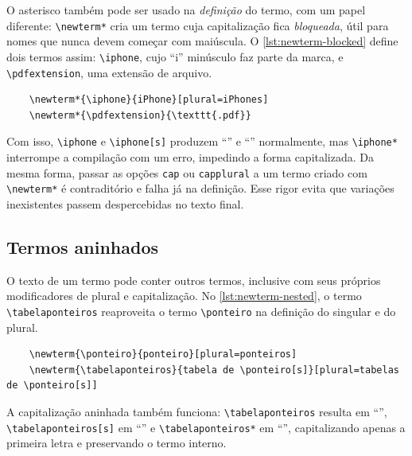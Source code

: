 O asterisco também pode ser usado na \emph{definição} do termo, com um papel diferente: \texttt{\textbackslash{}newterm*} cria um termo cuja capitalização fica \emph{bloqueada}, útil para nomes que nunca devem começar com maiúscula. O \autoref{lst:newterm-blocked} define dois termos assim: \texttt{\textbackslash{}iphone}, cujo \enquote{i} minúsculo faz parte da marca, e \texttt{\textbackslash{}pdfextension}, uma extensão de arquivo.

\begin{listing}[htb]
  \begin{verbatim}
    \newterm*{\iphone}{iPhone}[plural=iPhones]
    \newterm*{\pdfextension}{\texttt{.pdf}}
  \end{verbatim}
  \caption{Definição de termos com capitalização bloqueada}
  \label{lst:newterm-blocked}
\end{listing}

Com isso, \texttt{\textbackslash{}iphone} e \texttt{\textbackslash{}iphone[s]} produzem \enquote{\iphone} e \enquote{\iphone[s]} normalmente, mas \texttt{\textbackslash{}iphone*} interrompe a compilação com um erro, impedindo a forma capitalizada. Da mesma forma, passar as opções \texttt{cap} ou \texttt{capplural} a um termo criado com \texttt{\textbackslash{}newterm*} é contraditório e falha já na definição. Esse rigor evita que variações inexistentes passem despercebidas no texto final.

\subsection{Termos aninhados}

O texto de um termo pode conter outros termos, inclusive com seus próprios modificadores de plural e capitalização. No \autoref{lst:newterm-nested}, o termo \texttt{\textbackslash{}tabelaponteiros} reaproveita o termo \texttt{\textbackslash{}ponteiro} na definição do singular e do plural.

\begin{listing}[htb]
  \begin{verbatim}
    \newterm{\ponteiro}{ponteiro}[plural=ponteiros]
    \newterm{\tabelaponteiros}{tabela de \ponteiro[s]}[plural=tabelas de \ponteiro[s]]
  \end{verbatim}
  \caption{Definição de termos aninhados}
  \label{lst:newterm-nested}
\end{listing}

A capitalização aninhada também funciona: \texttt{\textbackslash{}tabelaponteiros} resulta em \enquote{\tabelaponteiros}, \texttt{\textbackslash{}tabelaponteiros[s]} em \enquote{\tabelaponteiros[s]} e \texttt{\textbackslash{}tabelaponteiros*} em \enquote{\tabelaponteiros*}, capitalizando apenas a primeira letra e preservando o termo interno.

